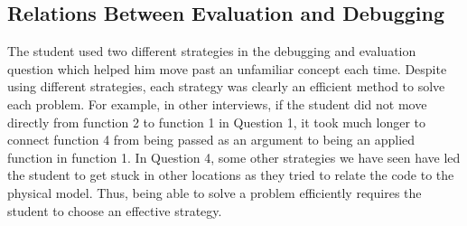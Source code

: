\subsection{Relations Between Evaluation and Debugging}
%
%

The student used two different strategies in the debugging and evaluation question which helped him move past an unfamiliar concept each time. Despite using different strategies, each strategy was clearly an efficient method to solve each problem. For example, in other interviews, if the student did not move directly from function 2 to function 1 in Question 1, it took much longer to connect function 4 from being passed as an argument to being an applied function in function 1. In Question 4, some other strategies we have seen have led the student to get stuck in other locations as they tried to relate the code to the physical model. Thus, being able to solve a problem efficiently requires the student to choose an effective strategy. 





